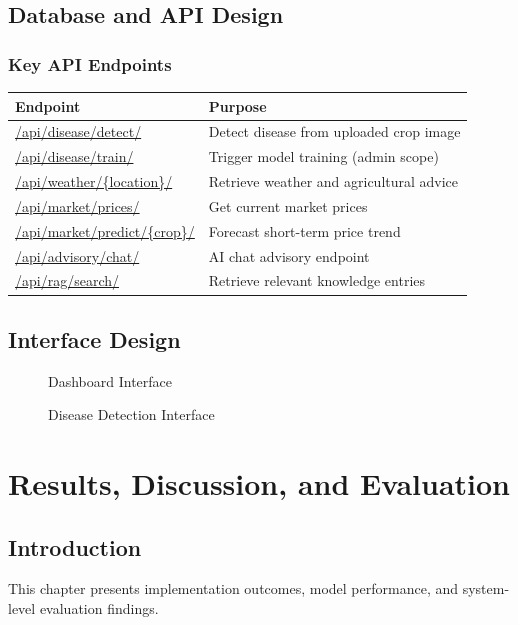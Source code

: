 \documentclass[12pt,a4paper]{report}
\begin{document}
\section{Database and API Design}
\subsection{Key API Endpoints}
\small
\begin{longtable}{p{4.8cm} p{8.8cm}}
\toprule
\textbf{Endpoint} & \textbf{Purpose} \\
\midrule
\url{/api/disease/detect/} & Detect disease from uploaded crop image \\
\url{/api/disease/train/} & Trigger model training (admin scope) \\
\url{/api/weather/{location}/} & Retrieve weather and agricultural advice \\
\url{/api/market/prices/} & Get current market prices \\
\url{/api/market/predict/{crop}/} & Forecast short-term price trend \\
\url{/api/advisory/chat/} & AI chat advisory endpoint \\
\url{/api/rag/search/} & Retrieve relevant knowledge entries \\
\bottomrule
\end{longtable}
\normalsize

\section{Interface Design}
\begin{figure}[H]
    \centering
    \caption{Dashboard Interface}
\end{figure}

\begin{figure}[H]
    \centering
    \caption{Disease Detection Interface}
\end{figure}

\chapter{Results, Discussion, and Evaluation}

\section{Introduction}
This chapter presents implementation outcomes, model performance, and system-level evaluation findings.
\end{document}
